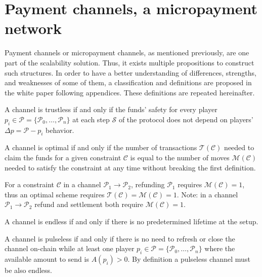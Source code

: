 \chapter{Payment channels, a micropayment network}
\label{chap:paymentChannels}

Payment channels or micropayment channels, as mentioned previously, are one part
of the scalability solution. Thus, it exists multiple propositions to construct such
structures. In order to have a better understanding of differences, strengths, and
weaknesses of some of them, a classification and definitions are proposed in the
white paper following appendices. These definitions are repeated hereinafter.

\begin{definition}[Trustless]
  A channel is trustless if and only if the funds' safety for every player
  $p_i \in \mathcal{P} = \{\mathcal{P}_0, \dots, \mathcal{P}_n\}$
  at each step $\mathcal{S}$ of the protocol does not depend on
  players' $\Delta p = \mathcal{P} - p_i$ behavior.
\end{definition}

\begin{definition}[Optimal]
  A channel is optimal if and only if the number of transactions $\mathcal{T}(\mathcal{C})$
  needed to claim the funds for a given constraint $\mathcal{C}$ is equal to
  the number of moves $\mathcal{M}(\mathcal{C})$ needed to satisfy the constraint
  at any time without breaking the first definition.

  For a constraint $\mathcal{C}$ in a channel $\mathcal{P}_1 \rightarrow \mathcal{P}_2$,
  refunding $\mathcal{P}_1$ requires $\mathcal{M}(\mathcal{C}) = 1$, thus
  an optimal scheme requires $\mathcal{T}(\mathcal{C}) = \mathcal{M}(\mathcal{C}) = 1$.
  Note: in a channel $\mathcal{P}_1 \rightarrow \mathcal{P}_2$ refund and settlement both
  require $\mathcal{M}(\mathcal{C}) = 1$.
\end{definition}

\begin{definition}[Endless]
  A channel is endless if and only if there is no predetermined lifetime at the setup.
\end{definition}

\begin{definition}[Pulseless]
  A channel is pulseless if and only if there is no need to refresh or close the
  channel on-chain while at least one player $p_i \in \mathcal{P} = \{\mathcal{P}_0,
  \dots, \mathcal{P}_n\}$ where the available amount to send is $A(p_i) > 0$. By
  definition a pulseless channel must be also endless.
\end{definition}

